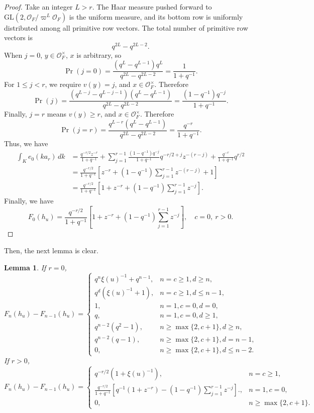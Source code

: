 \documentclass[11pt]{amsart}
\newtheorem {lemma}      [theorem]    {Lemma}
\theoremstyle{definition}
\numberwithin{equation}{section}
\begin{document}
\begin{proof}
		
		Take an integer \(L > r\). The Haar measure pushed forward to \(\mathrm{GL}(2,\mathcal{O}_F/\varpi^L\mathcal{O}_F)\) is the uniform measure, and its bottom row is uniformly distributed among all primitive row vectors. The total number of primitive row vectors is
		\[
		q^{2L} - q^{2L-2}.
		\]
		When \(j = 0\), \(y\in\mathcal{O}_F^\times\), \(x\) is arbitrary, so
		\[
		\operatorname{Pr}(j=0) = \frac{(q^L - q^{L-1})q^L}{q^{2L} - q^{2L-2}} = \frac{1}{1 + q^{-1}}.
		\]
		For \(1 \le j < r\), we require \(v(y) = j\), and \(x\in\mathcal{O}_F^\times\). Therefore
		\[
		\operatorname{Pr}(j) = \frac{(q^{L-j} - q^{L-j-1})(q^L - q^{L-1})}{q^{2L} - q^{2L-2}} = \frac{(1 - q^{-1})q^{-j}}{1 + q^{-1}}. 
		\]
		Finally, \(j = r\) means \(v(y) \ge r\), and \(x\in\mathcal{O}_F^\times\). Therefore
		\[
		\operatorname{Pr}(j=r) = \frac{q^{L-r}(q^L - q^{L-1})}{q^{2L} - q^{2L-2}} = \frac{q^{-r}}{1 + q^{-1}}.
		\]
		Thus, we have
		\begin{align*}
			\int_K e_0(ka_r) \, dk &= \frac{q^{-r/2}z^{-r}}{1+q^{-1}} + \sum_{j=1}^{r-1} \frac{(1-q^{-1})q^{-j}}{1+q^{-1}} q^{-r/2+j} z^{-(r-j)} + \frac{q^{-r}}{1+q^{-1}} q^{r/2}\\
			&=\frac{q^{-r/2}}{1+q^{-1}} \left[ z^{-r} + (1-q^{-1}) \sum_{j=1}^{r-1} z^{-(r-j)} + 1 \right]\\
			&=\frac{q^{-r/2}}{1+q^{-1}} \left[ 1 + z^{-r} + (1-q^{-1}) \sum_{j=1}^{r-1} z^{-j} \right].
		\end{align*}
		Finally, we have
		\[
		F_0(h_u) = \frac{q^{-r/2}}{1+q^{-1}} \left[ 1 + z^{-r} + (1-q^{-1}) \sum_{j=1}^{r-1} z^{-j} \right], \quad c=0, \ r>0.
		\]
	\end{proof}
	Then, the next lemma is clear.
	\begin{lemma}\label{320}
		If \(r=0\),
		\[
		F_n(h_u)-F_{n-1}(h_u) = \begin{cases} 
			q^n \xi(u)^{-1} + q^{n-1}, & n = c \ge 1, d \ge n, \\
			q^d(\xi(u)^{-1} + 1), & n = c \ge 1, d \le n - 1, \\
			1, & n = 1, c = 0, d = 0, \\
			q, & n = 1, c = 0, d \ge 1, \\
			q^{n-2}(q^2 - 1), & n \ge \max\{2, c + 1\}, d \ge n, \\
			q^{n-2}(q - 1), & n \ge \max\{2, c + 1\}, d = n - 1, \\
			0, & n \ge \max\{2, c + 1\}, d \le n - 2.
		\end{cases}
		\]
		If \(r > 0\),
		\[
		F_n(h_u)-F_{n-1}(h_u) = \begin{cases} 
			q^{-r/2}(1 + \xi(u)^{-1}), & n = c \ge 1, \\
			\frac{q^{-r/2}}{1+q^{-1}}
			\left[
			q^{-1}(1+z^{-r})
			-(1-q^{-1})\sum_{j=1}^{r-1}z^{-j}
			\right]., & n = 1, c = 0, \\
			0, & n \ge \max\{2, c + 1\}.
		\end{cases}
		\]
	\end{lemma}
\end{document}
